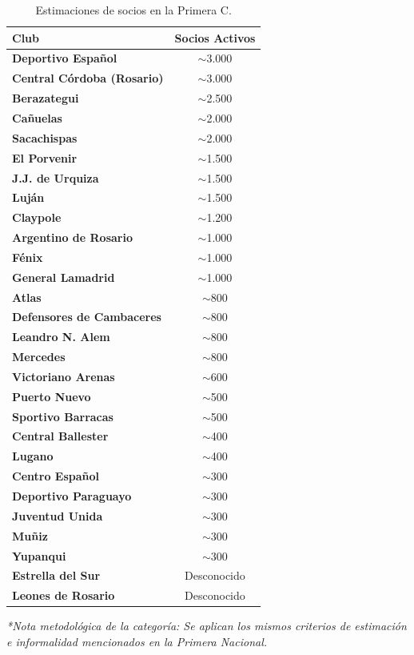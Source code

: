 \begin{table}[h!]
\centering
\renewcommand{\arraystretch}{1.1}
\begin{tabularx}{\textwidth}{|X|c|}
\hline
\rowcolor{gray!20} \textbf{Club} & \textbf{Socios Activos} \\ \hline
\textbf{Deportivo Español} & $\sim$3.000 \\ \hline
\textbf{Central Córdoba (Rosario)} & $\sim$3.000 \\ \hline
\textbf{Berazategui} & $\sim$2.500 \\ \hline
\textbf{Cañuelas} & $\sim$2.000 \\ \hline
\textbf{Sacachispas} & $\sim$2.000 \\ \hline
\textbf{El Porvenir} & $\sim$1.500 \\ \hline
\textbf{J.J. de Urquiza} & $\sim$1.500 \\ \hline
\textbf{Luján} & $\sim$1.500 \\ \hline
\textbf{Claypole} & $\sim$1.200 \\ \hline
\textbf{Argentino de Rosario} & $\sim$1.000 \\ \hline
\textbf{Fénix} & $\sim$1.000 \\ \hline
\textbf{General Lamadrid} & $\sim$1.000 \\ \hline
\textbf{Atlas} & $\sim$800 \\ \hline
\textbf{Defensores de Cambaceres} & $\sim$800 \\ \hline
\textbf{Leandro N. Alem} & $\sim$800 \\ \hline
\textbf{Mercedes} & $\sim$800 \\ \hline
\textbf{Victoriano Arenas} & $\sim$600 \\ \hline
\textbf{Puerto Nuevo} & $\sim$500 \\ \hline
\textbf{Sportivo Barracas} & $\sim$500 \\ \hline
\textbf{Central Ballester} & $\sim$400 \\ \hline
\textbf{Lugano} & $\sim$400 \\ \hline
\textbf{Centro Español} & $\sim$300 \\ \hline
\textbf{Deportivo Paraguayo} & $\sim$300 \\ \hline
\textbf{Juventud Unida} & $\sim$300 \\ \hline
\textbf{Muñiz} & $\sim$300 \\ \hline
\textbf{Yupanqui} & $\sim$300 \\ \hline
\textbf{Estrella del Sur} & Desconocido \\ \hline
\textbf{Leones de Rosario} & Desconocido \\ \hline
\end{tabularx}
\caption{Estimaciones de socios en la Primera C.}
\label{tab:anexo_primera_c}
\end{table}

\textit{*Nota metodológica de la categoría: Se aplican los mismos criterios de estimación e informalidad mencionados en la Primera Nacional.}
